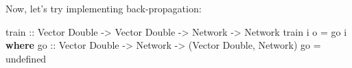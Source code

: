 \documentclass[]{article}
\newenvironment{Shaded}{}{}
\newcommand{\KeywordTok}[1]{\textcolor[rgb]{0.00,0.44,0.13}{\textbf{{#1}}}}
\newcommand{\DataTypeTok}[1]{\textcolor[rgb]{0.56,0.13,0.00}{{#1}}}
\newcommand{\OtherTok}[1]{\textcolor[rgb]{0.00,0.44,0.13}{{#1}}}
\newcommand{\FunctionTok}[1]{\textcolor[rgb]{0.02,0.16,0.49}{{#1}}}
\newcommand{\NormalTok}[1]{{#1}}
\begin{document}
Now, let's try implementing back-propagation:

\begin{Shaded}
\begin{Highlighting}[]
\OtherTok{train ::} \DataTypeTok{Vector} \DataTypeTok{Double} \OtherTok{->} \DataTypeTok{Vector} \DataTypeTok{Double} \OtherTok{->} \DataTypeTok{Network} \OtherTok{->} \DataTypeTok{Network}
\NormalTok{train i o }\FunctionTok{=} \NormalTok{go i}
  \KeywordTok{where}
\OtherTok{    go ::} \DataTypeTok{Vector} \DataTypeTok{Double} \OtherTok{->} \DataTypeTok{Network} \OtherTok{->} \NormalTok{(}\DataTypeTok{Vector} \DataTypeTok{Double}\NormalTok{, }\DataTypeTok{Network}\NormalTok{)}
    \NormalTok{go }\FunctionTok{=} \NormalTok{undefined}
\end{Highlighting}
\end{Shaded}
\end{document}
